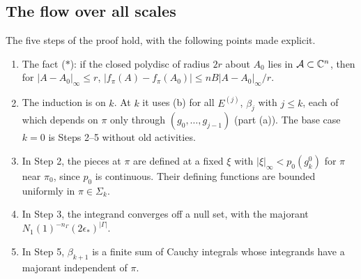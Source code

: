 \subsection{The flow over all scales}\label{xb:flow}

\begin{detail}\label{xb:d-cont}
The five steps of the proof hold, with the following points made explicit.
\begin{enumerate}[label=(\roman*)]
\item The fact ($*$): if the closed polydisc of radius $2r$ about $A_0$ lies in $\mathcal A\subset\mathbb C^n$, then for $|A-A_0|_\infty\le r$, $|f_\pi(A)-f_\pi(A_0)|\le nB|A-A_0|_\infty/r$.
\item The induction is on $k$. At $k$ it uses (b) for all $E^{(j)}$, $\beta_j$ with $j\le k$, each of which depends on $\pi$ only through $(g_0,\dots,g_{j-1})$ (part (a)). The base case $k=0$ is Steps 2--5 without old activities.
\item In Step 2, the pieces at $\pi$ are defined at a fixed $\xi$ with $|\xi|_\infty<p_0(g^0_k)$ for $\pi$ near $\pi_0$, since $p_0$ is continuous. Their defining functions are bounded uniformly in $\pi\in\Sigma_k$.
\item In Step 3, the integrand converges off a null set, with the majorant $N_1(1)^{-n_\Gamma}(2\epsilon_*)^{|\Gamma|}$.
\item In Step 5, $\beta_{k+1}$ is a finite sum of Cauchy integrals whose integrands have a majorant independent of $\pi$.
\end{enumerate}
\end{detail}

